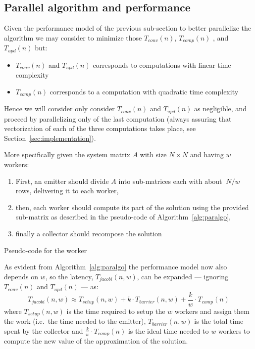 \subsection{Parallel algorithm and performance}\label{subsec:par}
Given the performance model of the previous sub-section to better parallelize the algorithm we may consider to minimize those $T_{conv}(n)$, $T_{comp}(n)$ , and $T_{upd}(n)$ but:
\begin{itemize}
	\item $T_{conv}(n)$ and $T_{upd}(n)$ corresponds to computations with linear time complexity
	\item $ T_{comp}(n)$ corresponds to a computation with quadratic time complexity
\end{itemize}
Hence we will consider only consider $T_{conv}(n)$ and $T_{upd}(n)$ as negligible, and proceed by parallelizing only of the last computation (always assuring that vectorization of each of the three computations takes place, see Section~\ref{sec:implementation}).

More specifically given the system matrix $A$ with size $N\times N$ and having $w$ workers:
\begin{enumerate}
	\item First, an emitter should divide $A$ into sub-matrices each with about $~ N/w$ rows, delivering it to each worker,
	\item then, each worker should compute its part of the solution using the provided sub-matrix as described in the pseudo-code of Algorithm~\ref{alg:paralgo},
	\item finally a collector should recompose the solution
\end{enumerate}

\begin{algorithm}[ht]
\vspace{1em}
\BlankLine
{}
\caption{Pseudo-code for the worker}
\label{alg:paralgo}
\end{algorithm}


As evident from Algorithm~\ref{alg:paralgo} the performance model now also depends on $w$, so the latency, $T_{jacobi}(n, w)$, can be expanded --- ignoring $T_{conv}(n)$ and $T_{upd}(n)$ --- as:
\[
	 T_{jacobi}(n, w) \approx T_{setup} (n, w) + k\cdot T_{barrier} (n, w) + \frac{k}{w} \cdot T_{comp}(n)
\]
where $T_{setup} (n, w)$ is the time required to setup the $w$ workers and assign them the work (i.e.\ the time needed to the emitter), $T_{barrier} (n, w)$ is the total time spent by the collector and $\frac{k}{w} \cdot T_{comp}(n)$ is the ideal time needed to $w$ workers to compute the new value of the approximation of the solution.
